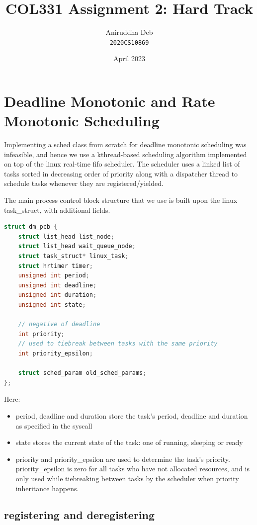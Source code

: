 \documentclass[12pt]{article}
\title{\textbf{COL331 Assignment 2: Hard Track}}
\author{Aniruddha Deb \\ \texttt{2020CS10869}}
\date{April 2023}
\begin{document}
\maketitle

\section{Deadline Monotonic and Rate Monotonic Scheduling}

Implementing a sched class from scratch for deadline monotonic scheduling was
infeasible, and hence we use a kthread-based scheduling algorithm implemented
on top of the linux real-time fifo scheduler. The scheduler uses a linked list 
of tasks sorted in decreasing order of priority along with a dispatcher thread 
to schedule tasks whenever they are registered/yielded.

The main process control block structure that we use is built upon the linux 
task\_struct, with additional fields.

\begin{lstlisting}[language=C]
struct dm_pcb {
 	struct list_head list_node;
	struct list_head wait_queue_node;
	struct task_struct* linux_task;
	struct hrtimer timer;
	unsigned int period;
	unsigned int deadline;
	unsigned int duration;
	unsigned int state;

	// negative of deadline
	int priority;
	// used to tiebreak between tasks with the same priority
	int priority_epsilon;

	struct sched_param old_sched_params;
};
\end{lstlisting}

Here:
\begin{itemize}
    \item period, deadline and duration store the task's period, deadline and 
        duration as specified in the syscall
    \item state stores the current state of the task: one of running, sleeping
        or ready
    \item priority and priority\_epsilon are used to determine the task's 
        priority. priority\_epsilon is zero for all tasks who have not allocated
        resources, and is only used while tiebreaking between tasks by the 
        scheduler when priority inheritance happens.
\end{itemize}

\subsection{registering and deregistering}
\end{document}
